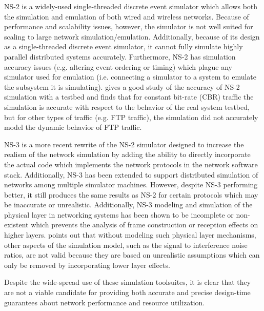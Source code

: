 NS-2\cite{ns2_real_time2004} is a widely-used single-threaded discrete
event simulator which allows both the simulation and emulation of both
wired and wireless networks.  Because of performance and scalability
issues, however, the simulator is not well suited for scaling to large
network simulation/emulation.  Additionally, because of its design as
a single-threaded discrete event simulator, it cannot fully simulate
highly parallel distributed systems accurately. Furthermore, NS-2 has
simulation accuracy issues (e.g. altering event ordering or timing)
which plague any simulator used for emulation (i.e. connecting a
simulator to a system to emulate the subsystem it is
simulating). \cite{simulator_comparison_2003} gives a good study of
the accuracy of NS-2 simulation with a testbed and finds that for
constant bit-rate (CBR) traffic the simulation is accurate with
respect to the behavior of the real system testbed, but for other
types of traffic (e.g. FTP traffic), the simulation did not accurately
model the dynamic behavior of FTP traffic.

NS-3\cite{ns3} is a more recent rewrite of the NS-2 simulator designed
to increase the realism of the network simulation by adding the
ability to directly incorporate the actual code which implements the
network protocols in the network software stack.  Additionally, NS-3
has been extended to support distributed simulation of networks among
multiple simulator machines.  However, despite NS-3 performing better,
it still produces the same results as NS-2\cite{bingmann2009accuracy}
for certain protocols which may be inaccurate or unrealistic.
Additionally, NS-3 modeling and simulation of the physical layer in
networking systems has been shown to be incomplete or
non-existent\cite{ns3_accuracy2} which prevents the analysis of frame
construction or reception effects on higher layers.
\cite{ns3_accuracy2} points out that without modeling such physical
layer mechanisms, other aspects of the simulation model, such as the
signal to interference noise ratios, are not valid because they are
based on unrealistic assumptions which can only be removed by
incorporating lower layer effects.

Despite the wide-spread use of these simulation toolsuites, it is
clear that they are not a viable candidate for providing both accurate
and precise design-time guarantees about network performance and
resource utilization.

